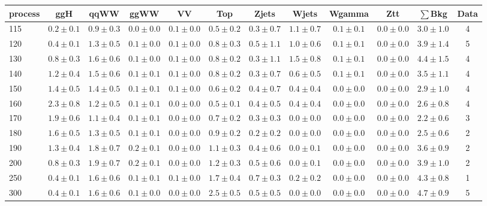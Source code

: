 \begin{table}[!hb]
{\footnotesize
 \begin{center}
 \begin{tabular}{l c c c c c c c c c c c }
 \hline
 process & ggH & qqWW & ggWW & VV & Top & Zjets & Wjets & Wgamma & Ztt & $\sum$Bkg & Data \\
 \hline
115 & $0.2\pm0.1$ & $0.9\pm0.3$ & $0.0\pm0.0$ & $0.1\pm0.0$ & $0.5\pm0.2$ & $0.3\pm0.7$ & $1.1\pm0.7$ & $0.1\pm0.1$ & $0.0\pm0.0$ & $3.0\pm1.0$ & 4 \\
120 & $0.4\pm0.1$ & $1.3\pm0.5$ & $0.1\pm0.0$ & $0.1\pm0.0$ & $0.8\pm0.3$ & $0.5\pm1.1$ & $1.0\pm0.6$ & $0.1\pm0.1$ & $0.0\pm0.0$ & $3.9\pm1.4$ & 5 \\
130 & $0.8\pm0.3$ & $1.6\pm0.6$ & $0.1\pm0.0$ & $0.1\pm0.0$ & $0.8\pm0.2$ & $0.3\pm1.1$ & $1.5\pm0.8$ & $0.1\pm0.1$ & $0.0\pm0.0$ & $4.4\pm1.5$ & 4 \\
140 & $1.2\pm0.4$ & $1.5\pm0.6$ & $0.1\pm0.1$ & $0.1\pm0.0$ & $0.8\pm0.2$ & $0.3\pm0.7$ & $0.6\pm0.5$ & $0.1\pm0.1$ & $0.0\pm0.0$ & $3.5\pm1.1$ & 4 \\
150 & $1.4\pm0.5$ & $1.4\pm0.5$ & $0.1\pm0.1$ & $0.1\pm0.0$ & $0.6\pm0.2$ & $0.4\pm0.7$ & $0.4\pm0.4$ & $0.0\pm0.0$ & $0.0\pm0.0$ & $2.9\pm1.0$ & 4 \\
160 & $2.3\pm0.8$ & $1.2\pm0.5$ & $0.1\pm0.1$ & $0.0\pm0.0$ & $0.5\pm0.1$ & $0.4\pm0.5$ & $0.4\pm0.4$ & $0.0\pm0.0$ & $0.0\pm0.0$ & $2.6\pm0.8$ & 4 \\
170 & $1.9\pm0.6$ & $1.1\pm0.4$ & $0.1\pm0.1$ & $0.0\pm0.0$ & $0.7\pm0.2$ & $0.3\pm0.3$ & $0.0\pm0.0$ & $0.0\pm0.0$ & $0.0\pm0.0$ & $2.2\pm0.6$ & 3 \\
180 & $1.6\pm0.5$ & $1.3\pm0.5$ & $0.1\pm0.1$ & $0.0\pm0.0$ & $0.9\pm0.2$ & $0.2\pm0.2$ & $0.0\pm0.0$ & $0.0\pm0.0$ & $0.0\pm0.0$ & $2.5\pm0.6$ & 2 \\
190 & $1.3\pm0.4$ & $1.8\pm0.7$ & $0.2\pm0.1$ & $0.0\pm0.0$ & $1.1\pm0.3$ & $0.4\pm0.6$ & $0.0\pm0.1$ & $0.0\pm0.0$ & $0.0\pm0.0$ & $3.6\pm0.9$ & 2 \\
200 & $0.8\pm0.3$ & $1.9\pm0.7$ & $0.2\pm0.1$ & $0.0\pm0.0$ & $1.2\pm0.3$ & $0.5\pm0.6$ & $0.0\pm0.1$ & $0.0\pm0.0$ & $0.0\pm0.0$ & $3.9\pm1.0$ & 2 \\
250 & $0.4\pm0.1$ & $1.6\pm0.6$ & $0.1\pm0.1$ & $0.1\pm0.0$ & $1.7\pm0.4$ & $0.7\pm0.3$ & $0.2\pm0.2$ & $0.0\pm0.0$ & $0.0\pm0.0$ & $4.3\pm0.8$ & 1 \\
300 & $0.4\pm0.1$ & $1.6\pm0.6$ & $0.1\pm0.0$ & $0.0\pm0.0$ & $2.5\pm0.5$ & $0.5\pm0.5$ & $0.0\pm0.0$ & $0.0\pm0.0$ & $0.0\pm0.0$ & $4.7\pm0.9$ & 5 \\

\end{tabular}
\end{center}}
\end{table}
